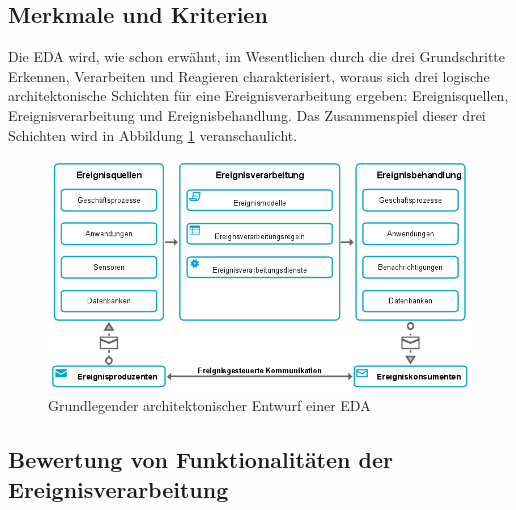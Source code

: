 \subsection{Merkmale und Kriterien}
Die \ac{EDA} wird, wie schon erwähnt, im Wesentlichen durch die drei Grundschritte Erkennen, Verarbeiten und Reagieren charakterisiert, woraus sich drei logische architektonische Schichten für eine Ereignisverarbeitung ergeben: Ereignisquellen, Ereignisverarbeitung und Ereignisbehandlung. Das
Zusammenspiel dieser drei Schichten wird  in Abbildung \ref{fig:Grundlegender architektonischer Entwurf einer EDA} veranschaulicht.

\begin{figure}[H]
	\centering 
    \includegraphics[width=\textwidth]{img/Ereignisverarbitungablauf.png}	
    \caption[Grundlegender architektonischer Entwurf einer EDA]
    {Grundlegender architektonischer Entwurf einer EDA}
    \label{fig:Grundlegender architektonischer Entwurf einer EDA}
\end{figure}




\subsection{Bewertung von Funktionalitäten der Ereignisverarbeitung}



